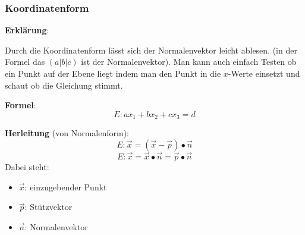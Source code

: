 
\subsubsection{Koordinatenform}
\textbf{Erklärung}: 

Durch die Koordinatenform lässt sich der Normalenvektor leicht ablesen. 
(in der Formel das $(a|b|c)$ ist der Normalenvektor).
Man kann auch einfach Testen ob ein Punkt auf der Ebene liegt indem man den Punkt in die $x$-Werte einsetzt und schaut ob die Gleichung stimmt.

\textbf{Formel}:
\[
E: ax_1 + bx_2 + cx_3 = d
\]

\textbf{Herleitung} (von Normalenform): 
\[
    E: \vec{x} = (\vec{x} - \vec{p}) \bullet \vec{n} 
\]
\[
    E: \vec{x} = \vec{x} \bullet \vec{n} = \vec{p} \bullet \vec{n}
\]
Dabei steht: 
\begin{itemize}
    \item $\vec{x}$: einzugebender Punkt
    \item $\vec{p}$: Stützvektor
    \item $\vec{n}$: Normalenvektor
\end{itemize}
